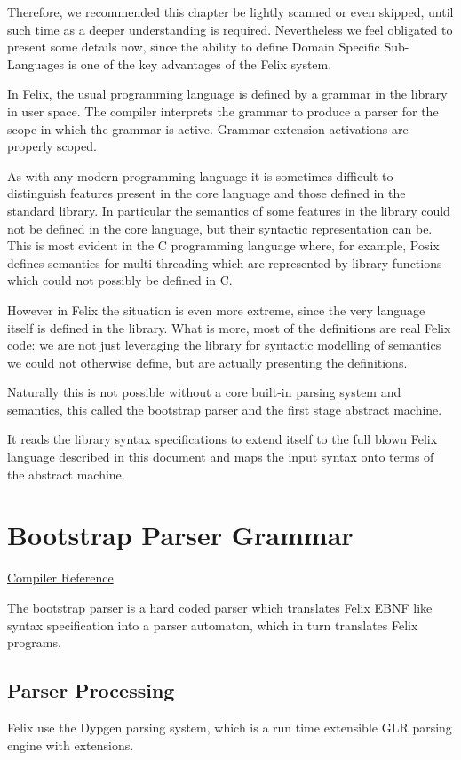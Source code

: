 \documentclass[oneside]{book}
\begin{document}
Therefore, we recommended this chapter be lightly scanned
or even skipped, until such time as a deeper understanding
is required. Nevertheless we feel obligated to present
some details now, since the ability to define Domain Specific
Sub-Languages is one of the key advantages of the Felix system.

In Felix, the usual programming language is defined by a grammar
in the library in user space. The compiler interprets the 
grammar to produce a parser
for the scope in which the grammar is active. Grammar extension
activations are properly scoped.

As with any modern programming language it is sometimes difficult
to distinguish features present in the core language and those
defined in the standard library. In particular the semantics of some 
features in the library could not be defined in the core language, 
but their syntactic representation can be. This is most evident
in the C programming language where, for example, Posix defines
semantics for multi-threading which are represented by library
functions which could not possibly be defined in C.

However in Felix the situation is even more extreme, since the very
language itself is defined in the library. What is more, most
of the definitions are real Felix code: we are not just
leveraging the library for syntactic modelling of semantics
we could not otherwise define, but are actually presenting
the definitions.

Naturally this is not possible without a core built-in parsing
system and semantics, this called the bootstrap parser
and the first stage abstract machine.

It reads the library syntax specifications to extend itself
to the full blown Felix language described in this document
and maps the input syntax onto terms of the abstract machine.


\section{Bootstrap Parser Grammar}
\href{http://felix-lang.org/share/src/compiler/flx_parse/flx_parse.dyp}{Compiler Reference}

The bootstrap parser is a hard coded parser which translates
Felix EBNF like syntax specification into a parser automaton,
which in turn translates Felix programs.

\subsection{Parser Processing}
Felix use the Dypgen parsing system, which is a run time
extensible GLR parsing engine with extensions. 
\end{document}

